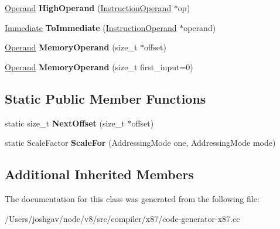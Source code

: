 \begin{DoxyCompactItemize}
\item 
\hyperlink{classv8_1_1internal_1_1_operand}{Operand} {\bfseries High\+Operand} (\hyperlink{classv8_1_1internal_1_1compiler_1_1_instruction_operand}{Instruction\+Operand} $\ast$op)\hypertarget{classv8_1_1internal_1_1compiler_1_1_x87_operand_converter_a81b61bc65378941402d5562415167143}{}\label{classv8_1_1internal_1_1compiler_1_1_x87_operand_converter_a81b61bc65378941402d5562415167143}

\item 
\hyperlink{classv8_1_1internal_1_1_immediate}{Immediate} {\bfseries To\+Immediate} (\hyperlink{classv8_1_1internal_1_1compiler_1_1_instruction_operand}{Instruction\+Operand} $\ast$operand)\hypertarget{classv8_1_1internal_1_1compiler_1_1_x87_operand_converter_a7bd50ed2af40bfbef49f910744543f0e}{}\label{classv8_1_1internal_1_1compiler_1_1_x87_operand_converter_a7bd50ed2af40bfbef49f910744543f0e}

\item 
\hyperlink{classv8_1_1internal_1_1_operand}{Operand} {\bfseries Memory\+Operand} (size\+\_\+t $\ast$offset)\hypertarget{classv8_1_1internal_1_1compiler_1_1_x87_operand_converter_a36ca7045c6dc67572735d73b4f7e9bb1}{}\label{classv8_1_1internal_1_1compiler_1_1_x87_operand_converter_a36ca7045c6dc67572735d73b4f7e9bb1}

\item 
\hyperlink{classv8_1_1internal_1_1_operand}{Operand} {\bfseries Memory\+Operand} (size\+\_\+t first\+\_\+input=0)\hypertarget{classv8_1_1internal_1_1compiler_1_1_x87_operand_converter_af41de19f4d18db56e586e3e247e3598d}{}\label{classv8_1_1internal_1_1compiler_1_1_x87_operand_converter_af41de19f4d18db56e586e3e247e3598d}

\end{DoxyCompactItemize}
\subsection*{Static Public Member Functions}
\begin{DoxyCompactItemize}
\item 
static size\+\_\+t {\bfseries Next\+Offset} (size\+\_\+t $\ast$offset)\hypertarget{classv8_1_1internal_1_1compiler_1_1_x87_operand_converter_a6ae96b0e010fbfa8d1d42f880010bb4d}{}\label{classv8_1_1internal_1_1compiler_1_1_x87_operand_converter_a6ae96b0e010fbfa8d1d42f880010bb4d}

\item 
static Scale\+Factor {\bfseries Scale\+For} (Addressing\+Mode one, Addressing\+Mode mode)\hypertarget{classv8_1_1internal_1_1compiler_1_1_x87_operand_converter_a6c8846202e2be4341d7662641d09cfd3}{}\label{classv8_1_1internal_1_1compiler_1_1_x87_operand_converter_a6c8846202e2be4341d7662641d09cfd3}

\end{DoxyCompactItemize}
\subsection*{Additional Inherited Members}


The documentation for this class was generated from the following file\+:\begin{DoxyCompactItemize}
\item 
/\+Users/joshgav/node/v8/src/compiler/x87/code-\/generator-\/x87.\+cc\end{DoxyCompactItemize}
